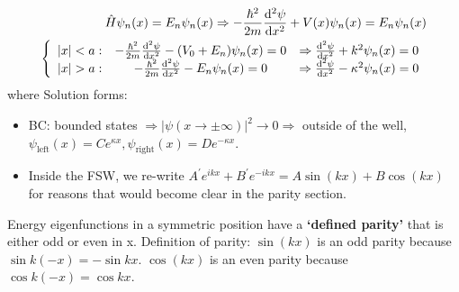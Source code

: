 \documentclass{school-22.101-notes}
\begin{document}
\begin{align}
\hat{H} \psi_n(x)  = E_n \psi_n (x)  \Rightarrow - \frac{\hbar^2}{2m }   \frac{\mathrm{d}^{2}\psi}{\mathrm{d}x^{2}} + V(x) \psi_n (x) = E_n \psi_n (x) \\
\left\{ 
\begin{array}{ccc}
|x| < a:  & - \frac{\hbar^2}{2m } \frac{\mathrm{d}^{2}\psi}{\mathrm{d}x^{2}}  -  (V_0 + E_n) \psi_n (x) = 0 & \Rightarrow \frac{\mathrm{d}^{2}\psi}{\mathrm{d}x^{2}} + k^2 \psi_n (x) = 0 \\
|x| > a:  & - \frac{\hbar^2}{2m } \frac{\mathrm{d}^{2}\psi}{\mathrm{d}x^{2}}  -  E_n \psi_n (x) = 0         & \Rightarrow \frac{\mathrm{d}^{2}\psi}{\mathrm{d}x^{2}} - \kappa^2 \psi_n (x) = 0 
\end{array}
\right.
\end{align}
where
Solution forms:
\begin{itemize}
\item BC: bounded states $ \Rightarrow |\psi (x \to \pm \infty)|^2 \to 0 \Rightarrow$ outside of the well, $\psi_{\mathrm{left}} (x) = C e^{\kappa x}, \psi_{\mathrm{right}} (x) = D e^{-\kappa x}$. 

\item Inside the FSW, we re-write $A^{\prime} e^{ikx} + B^{\prime} e^{-ikx} = A \sin (kx) + B \cos(kx)$ for reasons that would become clear in the parity section. 
\end{itemize}

Energy eigenfunctions in a symmetric position have a \textbf{`defined parity'} that is either odd or even in x. Definition of parity: $\sin(kx)$ is an odd parity because $\sin k(-x) = - \sin kx$. $\cos (kx)$ is an even parity because $\cos k(-x) = \cos kx$. 
\end{document}
